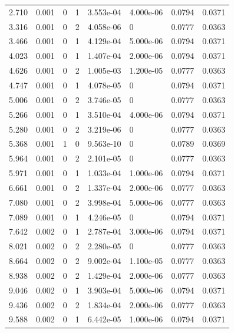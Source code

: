 \documentclass[preview]{standalone}
\begin{document}
{{\begin{tabular}{L{1.2cm}C{1.2cm} C{0.3cm}C{0.5cm} C{1.4cm}C{1.4cm} C{1.4cm}C{1.4cm}}
  2.710  &  0.001  & 0     &  1 &  3.553e-04  & 4.000e-06  & 0.0794 &  0.0371   \\ 
  3.316  &  0.001  & 0     &  2 &  4.058e-06  & 0  & 0.0777 &  0.0363   \\ 
  3.466  &  0.001  & 0     &  1 &  4.129e-04  & 5.000e-06  & 0.0794 &  0.0371   \\ 
  4.023  &  0.001  & 0     &  1 &  1.407e-04  & 2.000e-06  & 0.0794 &  0.0371   \\ 
  4.626  &  0.001  & 0     &  2 &  1.005e-03  & 1.200e-05  & 0.0777 &  0.0363   \\ 
  4.747  &  0.001  & 0     &  1 &  4.078e-05  & 0  & 0.0794 &  0.0371   \\ 
  5.006  &  0.001  & 0     &  2 &  3.746e-05  & 0  & 0.0777 &  0.0363   \\ 
  5.266  &  0.001  & 0     &  1 &  3.510e-04  & 4.000e-06  & 0.0794 &  0.0371   \\ 
  5.280  &  0.001  & 0     &  2 &  3.219e-06  & 0  & 0.0777 &  0.0363   \\ 
  5.368  &  0.001  & 1     &  0 &  9.563e-10  & 0  & 0.0789 &  0.0369   \\ 
  5.964  &  0.001  & 0     &  2 &  2.101e-05  & 0  & 0.0777 &  0.0363   \\ 
  5.971  &  0.001  & 0     &  1 &  1.033e-04  & 1.000e-06  & 0.0794 &  0.0371   \\ 
  6.661  &  0.001  & 0     &  2 &  1.337e-04  & 2.000e-06  & 0.0777 &  0.0363   \\ 
  7.080  &  0.001  & 0     &  2 &  3.998e-04  & 5.000e-06  & 0.0777 &  0.0363   \\ 
  7.089  &  0.001  & 0     &  1 &  4.246e-05  & 0  & 0.0794 &  0.0371   \\ 
  7.642  &  0.002  & 0     &  1 &  2.787e-04  & 3.000e-06  & 0.0794 &  0.0371   \\ 
  8.021  &  0.002  & 0     &  2 &  2.280e-05  & 0  & 0.0777 &  0.0363   \\ 
  8.664  &  0.002  & 0     &  2 &  9.002e-04  & 1.100e-05  & 0.0777 &  0.0363   \\ 
  8.938  &  0.002  & 0     &  2 &  1.429e-04  & 2.000e-06  & 0.0777 &  0.0363   \\ 
  9.046  &  0.002  & 0     &  1 &  3.903e-04  & 5.000e-06  & 0.0794 &  0.0371   \\ 
  9.436  &  0.002  & 0     &  2 &  1.834e-04  & 2.000e-06  & 0.0777 &  0.0363   \\ 
  9.588  &  0.002  & 0     &  1 &  6.442e-05  & 1.000e-06  & 0.0794 &  0.0371   \\ 

\end{tabular}}}
\end{document}
